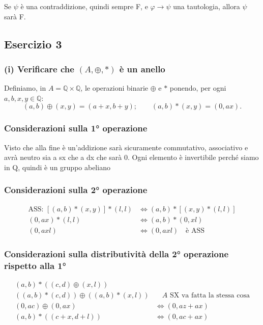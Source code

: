 Se $\psi$ è una contraddizione, quindi sempre F, e $\varphi \to \psi$ una tautologia, allora $\psi$ sarà F.

\subsection{Esercizio 3}

\subsubsection*{(i) Verificare che $(A, \oplus, *)$ è un anello}

Definiamo, in $A = \mathbb{Q} \times \mathbb{Q}$, le operazioni binarie $\oplus$ e $*$ ponendo, per ogni $a, b, x, y \in \mathbb{Q}$:
$$(a,b) \oplus (x,y) = (a+x, b+y); \qquad (a,b) * (x,y) = (0, ax).$$

\subsubsection*{Considerazioni sulla 1° operazione}

Visto che alla fine è un'addizione sarà sicuramente commutativo, associativo e avrà neutro sia a sx che a dx che sarà 0. Ogni elemento è invertibile perché siamo in Q, quindi è un gruppo abeliano

\subsubsection*{Considerazioni sulla 2° operazione}

\begin{align*}
\text{ASS: } [(a,b) * (x,y)] * (l,l) &\Leftrightarrow (a,b) * [(x,y) * (l,l)] \\
(0, ax) * (l,l) &\Leftrightarrow (a,b) * (0, xl) \\
(0, axl) &\Leftrightarrow (0, axl) \quad \text{è ASS}
\end{align*}

\subsubsection*{Considerazioni sulla distributività della 2° operazione rispetto alla 1°}

\begin{align*}
(a,b) * ((c,d) \oplus (x,l)) \\
((a,b) * (c,d)) \oplus ((a,b) * (x,l)) &\quad A \text{ SX va fatta la stessa cosa} \\
(0, ac) \oplus (0, ax) &\Leftrightarrow (0, az + ax) \\
(a,b) * ((c+x, d+l)) &\Leftrightarrow (0, ac + ax)
\end{align*}

